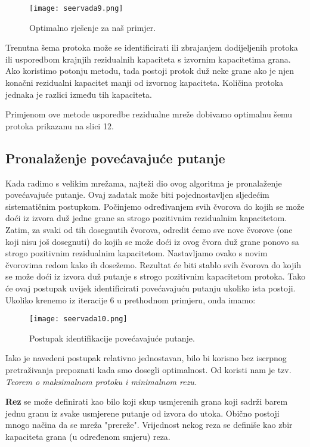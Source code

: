 \documentclass[11pt, a4paper]{article}
\begin{document}
	\begin{figure}[h]
		\centering
		\texttt{[image: seervada9.png]}
		\caption{Optimalno rješenje za naš primjer.}
		\label{fig:slika12}
	\end{figure}
	
	Trenutna šema protoka može se identificirati ili zbrajanjem dodijeljenih protoka ili usporedbom krajnjih rezidualnih kapaciteta s izvornim kapacitetima grana. Ako koristimo potonju metodu, tada postoji protok duž neke grane ako je njen konačni rezidualni kapacitet manji od izvornog kapaciteta. Količina protoka jednaka je razlici između tih kapaciteta.
	
	Primjenom ove metode usporedbe rezidualne mreže dobivamo optimalnu šemu protoka prikazanu na slici 12.
	
	\pagebreak
	\subsection{Pronalaženje povećavajuće putanje}
	
	Kada radimo s velikim mrežama, najteži dio ovog algoritma  je pronalaženje povećavajuće putanje. Ovaj zadatak može biti pojednostavljen sljedećim sistematičnim postupkom. Počinjemo određivanjem svih čvorova do kojih se može doći iz izvora duž jedne grane sa strogo pozitivnim rezidualnim kapacitetom. Zatim, za svaki od tih dosegnutih čvorova, odredit ćemo sve nove čvorove (one koji nisu još dosegnuti) do kojih se može doći iz ovog čvora duž grane ponovo sa strogo pozitivnim rezidualnim kapacitetom. Nastavljamo ovako s novim čvorovima redom kako ih dosežemo. Rezultat će biti stablo svih čvorova do kojih se može doći iz izvora duž putanje s strogo pozitivnim kapacitetom protoka. Tako će ovaj postupak uvijek identificirati povećavajuću putanju ukoliko ista postoji. Ukoliko krenemo iz iteracije 6 u prethodnom primjeru, onda imamo:
	
	\begin{figure}[h]
		\centering
		\texttt{[image: seervada10.png]}
		\caption{Postupak identifikacije povećavajuće putanje.}
		\label{fig:slika13}
	\end{figure}
	
	Iako je navedeni postupak relativno jednostavan, bilo bi korisno bez iscrpnog pretraživanja prepoznati kada smo dosegli optimalnost. Od koristi nam je tzv. \textit{Teorem o maksimalnom protoku i minimalnom rezu.}
	
	\textbf{Rez} se može definirati kao bilo koji skup usmjerenih grana koji sadrži barem jednu granu iz svake usmjerene putanje od izvora do utoka. Obično postoji mnogo načina da se mreža "prereže". Vrijednost nekog reza se definiše kao zbir kapaciteta grana (u određenom smjeru) reza.
	
\end{document}
